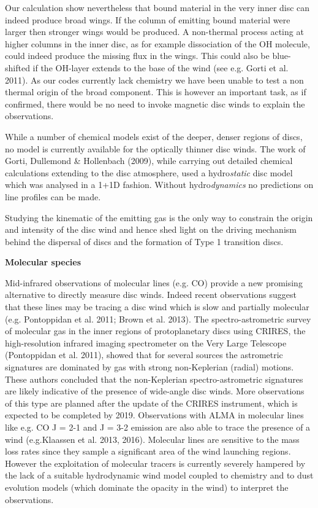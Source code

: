 \documentclass[10pt,fleqn,twoside]{article}
\begin{document}
Our calculation show nevertheless that bound material in the very
inner disc can indeed produce broad wings. If the column of emitting
bound material were larger then stronger wings would be produced. A
non-thermal process acting at higher columns in the inner disc, as for
example dissociation of the OH molecule, could
indeed produce the missing flux in the wings. This could also be
blue-shifted if the OH-layer extends to the base of the wind (see e.g.
Gorti et al. 2011). As our codes currently
lack chemistry we have been unable to test a non thermal
origin of the broad component. This is however an important task, as
if confirmed, there would be no need to invoke magnetic disc winds to
explain the observations.  

 While a number of chemical models exist
of the deeper, denser regions of discs, no model is currently
available for the optically thinner disc winds. The work of Gorti, Dullemond \&
Hollenbach (2009), while carrying out detailed chemical calculations
extending to the disc atmosphere, used a hydro{\it static} disc model which
was analysed in a 1+1D fashion. Without hydro{\it dynamics} no predictions
on line profiles can be made.  

Studying the kinematic of the emitting gas is the only way to
constrain the origin and intensity of the disc wind and hence shed
light on the driving mechanism behind the dispersal of discs and the
formation of Type 1 transition discs. 

{\bf Molecular species}

Mid-infrared observations of molecular lines (e.g. CO) provide a new
promising alternative to directly measure disc winds. Indeed recent
observations suggest that these lines may be tracing a disc wind which
is slow and partially molecular (e.g. Pontoppidan et al. 2011; Brown et al. 2013). 
The spectro-astrometric survey of molecular gas in the inner regions of
protoplanetary discs using CRIRES, the high-resolution infrared
imaging spectrometer on the Very Large Telescope (Pontoppidan et
al. 2011), showed that for several sources the astrometric signatures
are dominated by gas with strong non-Keplerian (radial) motions. These
authors concluded that the non-Keplerian spectro-astrometric
signatures are likely indicative of the presence of wide-angle disc
winds. 
More observations of this type are planned after the update of
the CRIRES instrument, which is expected to be completed by
2019. Observations with ALMA in molecular lines like e.g. CO J = 2-1
and J = 3-2 emission are also able to trace the presence of a wind (e.g.Klaassen et al. 2013, 2016).  
Molecular lines are sensitive to the mass loss rates since they
sample a significant area of the wind launching regions. However the
exploitation of molecular tracers is currently severely hampered by
the lack of a suitable hydrodynamic wind model coupled to chemistry
and to dust evolution models (which dominate the opacity in the wind)
to interpret the observations.
\end{document}
